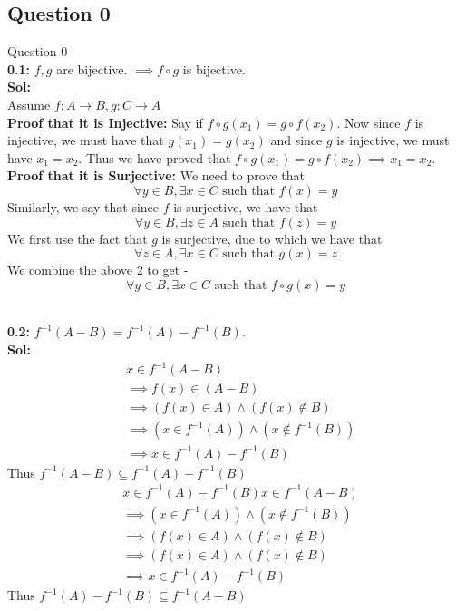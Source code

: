 \documentclass[xcolor=svgnames]{beamer}
\begin{document}
\subsection{Question 0}
\begin{frame}{Question 0}
\footnotesize{
    \\ \textbf{0.1:} $ f,g$ are bijective. $\implies f \circ g$ is bijective.
    \\ \textbf{Sol:} 
    \\ Assume $f:A \rightarrow B, g:C \rightarrow A$
     \\ \textbf{Proof that it is Injective:} Say if $f \circ g (x_1) = g \circ f (x_2)$. Now since $f$ is injective, we must have that $g (x_1) = g (x_2)$ and since $g$ is injective, we must have $x_1 = x_2$. Thus we have proved that $f \circ g (x_1) = g \circ f (x_2) \implies x_1 = x_2$.
      \\ \textbf{Proof that it is Surjective:} We need to prove that 
      $$\forall y \in B, \exists x \in C \text{ such that } f(x) = y$$
      Similarly, we say that since $f$ is surjective, we have that 
      $$\forall y \in B, \exists z \in A \text{ such that } f(z) = y$$
      We first use the fact that $g$ is surjective, due to which we have that $$\forall z \in A, \exists x \in C \text{ such that } g(x) = z$$
      We combine the above 2 to get - 
      $$\forall y \in B, \exists x \in C \text{ such that } f\circ g(x) = y$$
}
\end{frame}
\begin{frame}{}
\footnotesize{
    \\ \textbf{0.2:}  $f^{-1}(A - B) = f^{-1}(A) - f^{-1}(B)$.
    \\ \textbf{Sol:}
    \begin{align*}
        & x \in f^{-1}(A - B)
        \\ & \implies f(x) \in (A - B)
        \\ & \implies (f(x) \in A) \land (f(x) \notin B)
        \\ & \implies (x \in f^{-1}(A)) \land (x \notin f^{-1}(B))
        \\ & \implies x \in f^{-1}(A) - f^{-1}(B)
    \end{align*}
    Thus $f^{-1}(A - B) \subseteq f^{-1}(A) - f^{-1}(B)$
    \begin{align*}
        & x \in f^{-1}(A) - f^{-1}(B)
        x \in f^{-1}(A - B)
        \\ & \implies (x \in f^{-1}(A)) \land (x \notin f^{-1}(B))
        \\ & \implies (f(x) \in A) \land (f(x) \notin B)
        \\ & \implies (f(x) \in A) \land (f(x) \notin B)
        \\ & \implies x \in f^{-1}(A) - f^{-1}(B)
    \end{align*}    
    Thus $f^{-1}(A) - f^{-1}(B) \subseteq f^{-1}(A - B)$
}
\end{frame}
\end{document}
